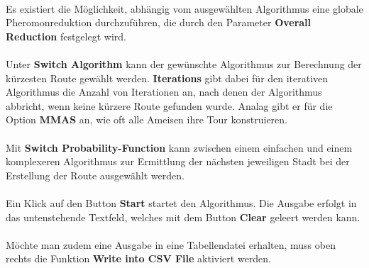 \documentclass[doktyp=barbeit, sprache=german]{TUBAFarbeiten}
\begin{document}
\\Es existiert die Möglichkeit, abhängig vom ausgewählten Algorithmus eine globale Pheromonreduktion durchzuführen, die durch den Parameter \textbf{Overall Reduction} festgelegt wird.
\\\\Unter \textbf{Switch Algorithm} kann der gewünschte Algorithmus zur Berechnung der kürzesten Route gewählt werden. \textbf{Iterations} gibt dabei für den iterativen Algorithmus die Anzahl von Iterationen an, nach denen der Algorithmus abbricht, wenn keine kürzere Route gefunden wurde. Analag gibt er für die Option \textbf{MMAS} an, wie oft alle Ameisen ihre Tour konstruieren.
\\\\Mit \textbf{Switch Probability-Function} kann zwischen einem einfachen und einem komplexeren Algorithmus zur Ermittlung der nächsten jeweiligen Stadt bei der Erstellung der Route ausgewählt werden.
\\\\Ein Klick auf den Button \textbf{Start} startet den Algorithmus. Die Ausgabe erfolgt in das untenstehende Textfeld, welches mit dem Button \textbf{Clear} geleert werden kann.
\\\\Möchte man zudem eine Ausgabe in eine Tabellendatei erhalten, muss oben rechts die Funktion \textbf{Write into CSV File} aktiviert werden.

\newpage
{}
\end{document}
